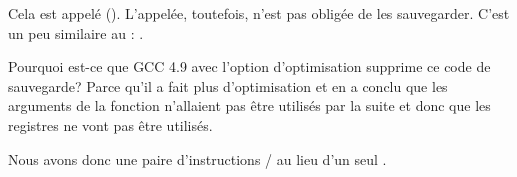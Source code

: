 Cela est appelé  (\ARMPCS).
L'appelée, toutefois, n'est pas obligée de les sauvegarder.
C'est un peu similaire au : .

Pourquoi est-ce que GCC 4.9 avec l'option d'optimisation supprime ce code de sauvegarde?
Parce qu'il a fait plus d'optimisation et en a conclu que les arguments de la fonction
n'allaient pas être utilisés par la suite et donc que les registres 
ne vont pas être utilisés.


Nous avons donc une paire d'instructions / au lieu d'un seul .
